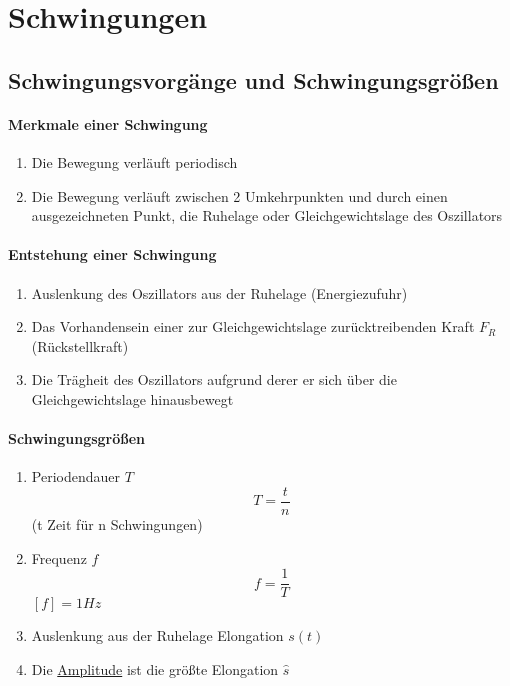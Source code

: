 \documentclass[12 pt]{article}
\numberwithin{equation}{section}
\begin{document}
	\section{Schwingungen}
	\subsection{Schwingungsvorgänge und Schwingungsgrößen}
	\paragraph{Merkmale einer Schwingung}
	\begin{enumerate}
		\item Die Bewegung verläuft periodisch
		\item Die Bewegung verläuft zwischen 2 Umkehrpunkten und durch einen ausgezeichneten Punkt, die Ruhelage oder Gleichgewichtslage des Oszillators
	\end{enumerate}
	\paragraph{Entstehung einer Schwingung}
	\begin{enumerate}
		\item Auslenkung des Oszillators aus der Ruhelage (Energiezufuhr)
		\item Das Vorhandensein einer zur Gleichgewichtslage zurücktreibenden Kraft $F_R$ (Rückstellkraft)
		\item Die Trägheit des Oszillators aufgrund derer er sich über die Gleichgewichtslage hinausbewegt
	\end{enumerate}
	\paragraph{Schwingungsgrößen}
	\begin{enumerate}
		\item Periodendauer $T$
		\begin{equation*}
			T=\frac{t}{n}
		\end{equation*}
		(t Zeit für n Schwingungen)
		\item Frequenz $f$
		\begin{equation*}
			f=\frac{1}{T}
		\end{equation*}
		 $[f]=1Hz$
		 \item Auslenkung aus der Ruhelage Elongation $s(t)$
		 \item Die \underline{Amplitude} ist die größte Elongation $\hat{s}$
	\end{enumerate}
\end{document}
